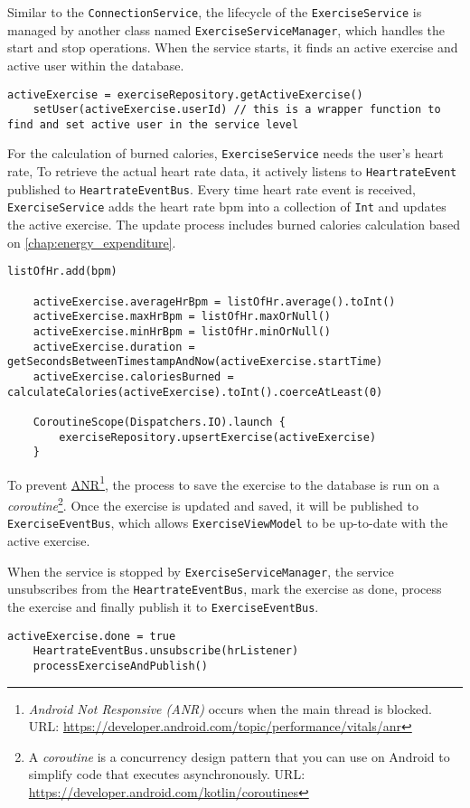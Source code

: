 Similar to the \verb;ConnectionService;, the lifecycle of the \verb;ExerciseService; is managed by another class named \verb;ExerciseServiceManager;, which handles the start and stop operations. 
When the service starts, it finds an active exercise and active user within the database. 
\begin{lstlisting}[caption={On ExerciseService started (Kotlin - ExerciseService)}]
    activeExercise = exerciseRepository.getActiveExercise()
    setUser(activeExercise.userId) // this is a wrapper function to find and set active user in the service level
\end{lstlisting}

For the calculation of burned calories, \verb;ExerciseService; needs the user's heart rate, To retrieve the actual heart rate data, it actively listens to \verb;HeartrateEvent; published to \verb;HeartrateEventBus;.
Every time heart rate event is received, \verb;ExerciseService; adds the heart rate bpm into a collection of \verb;Int; and updates the active exercise. The update process includes burned calories calculation based on \autoref{chap:energy_expenditure}. 
\begin{lstlisting}[caption={Process active exercise snippet (Kotlin - ExerciseService)}]
    listOfHr.add(bpm)

    activeExercise.averageHrBpm = listOfHr.average().toInt()
    activeExercise.maxHrBpm = listOfHr.maxOrNull()
    activeExercise.minHrBpm = listOfHr.minOrNull()
    activeExercise.duration = getSecondsBetweenTimestampAndNow(activeExercise.startTime)
    activeExercise.caloriesBurned = calculateCalories(activeExercise).toInt().coerceAtLeast(0)

    CoroutineScope(Dispatchers.IO).launch {
        exerciseRepository.upsertExercise(activeExercise)
    }
\end{lstlisting}

To prevent \url{ANR}\footnote{\emph{Android Not Responsive (ANR)} occurs when the main thread is blocked. URL: \url{https://developer.android.com/topic/performance/vitals/anr}}, the process to save the exercise to the database is run on a \emph{coroutine}\footnote{A \emph{coroutine} is a concurrency design pattern that you can use on Android to simplify code that executes asynchronously. URL: \url{https://developer.android.com/kotlin/coroutines}}.
Once the exercise is updated and saved, it will be published to \verb;ExerciseEventBus;, which allows \verb;ExerciseViewModel; to be up-to-date with the active exercise.

When the service is stopped by \verb;ExerciseServiceManager;, the service unsubscribes from the \verb;HeartrateEventBus;, mark the exercise as done, process the exercise and finally publish it to \verb;ExerciseEventBus;.
\begin{lstlisting}[caption={On exercise stopped snippet (Kotlin - ExerciseService)}]
    activeExercise.done = true
    HeartrateEventBus.unsubscribe(hrListener)
    processExerciseAndPublish()
\end{lstlisting}